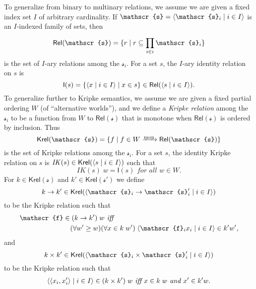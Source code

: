 \documentclass[sigplan,screen,nonacm,balance=false]{acmart}
\theoremstyle{plain}
\DeclarePairedDelimiter{\set}{\{}{\}}
\DeclarePairedDelimiter{\pair}{\langle}{\rangle}
\newcommand{\Rel}{\mathsf{Rel}}
\newcommand{\Id}{\mathsf{I}}
\newcommand{\Krel}{\mathsf{Krel}}
\newcommand{\IK}{\mathit{IK}}
\newcommand{\scrs}{\mathscr{s}}
\newcommand{\scrf}{\mathscr{f}}
\begin{document}
To generalize from binary to multinary relations, we assume we are given a fixed index set $I$ of arbitrary cardinality.
If $\scrs = \pair{\scrs_i \mid i \in I}$ is an $I$-indexed family of sets, then
%
\begin{equation*}
  \Rel(\scrs) = \set{r \mid r \subseteq \prod_{i \in i}^{} \scrs_i}
\end{equation*}
%
is the set of $I$-ary relations among the $\scrs_i$.
For a set $s$, the $I$-ary identity relation on $s$ is
%
\begin{equation*}
  \Id(s) = \set{\pair{x \mid i \in I} \mid x \in s} \in \Rel(\pair{s \mid i \in I}).
\end{equation*}
%
To generalize further to Kripke semantics, we assume we are given a fixed partial ordering $W$ (of ``alternative worlds''), and we define a \emph{Kripke relation} among the $\scrs_i$ to be a function from $W$ to $\Rel(\scrs)$ that is monotone when $\Rel(\scrs)$ is ordered by inclusion. Thus
%
\begin{equation*}
  \Krel(\scrs) = \set{f \mid f \in W \xrightarrow{\raisebox{0pt}[0pt][0pt]{$_\mathrm{mon}$}} \Rel(\scrs)}
\end{equation*}
%
is the set of Kripke relations among the $\scrs_i$.
For a set $s$, the identity Kripke relation on $s$ is $\IK(s) \in \Krel(\pair{s \mid i \in I})$ such that
%
\begin{equation*}
  \IK(s) \; w = \Id(s) \textit{ for all } w \in W.
\end{equation*}
%
For $k \in \Krel(\scrs)$ and $k' \in \Krel(\scrs')$ we define
%
\begin{equation*}
  k \to k' \in \Krel(\pair{\scrs_i \to \scrs'_i \mid i \in I})
\end{equation*}
%
to be the Kripke relation such that
%
\begin{align*}
  \scrf & \in (k \to k') \; w \textit{ iff } \\
  & \quad (\forall w' \geq w) (\forall x \in k \; w') \; \pair{\scrf_i x_i \mid i \in I} \in k' w',
\end{align*}
%
and
%
\begin{equation*}
  k \times k' \in \Krel(\pair{\scrs_i \times \scrs'_i \mid i \in I})
\end{equation*}
%
to be the Kripke relation such that
%
\begin{align*}
  \pair{\pair{x_i, x'_i} \mid i \in I} \in (k \times k') \; w \textit{ iff } x \in k \; w \textit{ and } x' \in k' w.
\end{align*}
\end{document}
